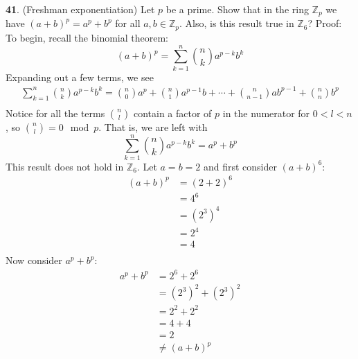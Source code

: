 \documentclass{article}
\begin{document}
\newline\newline
\textbf{41}. (Freshman exponentiation) Let $p$ be a prime. Show that in the ring $\mathbb{Z}_p$ we have $(a + b)^p = a^p + b^p$ for all $a,b \in \mathbb{Z}_p$. Also, is this result true in $\mathbb{Z}_6$?
\newline\newline
Proof: To begin, recall the binomial theorem:
\[(a + b)^p = \sum_{k=1}^n {n \choose k} a^{p-k}b^k\]
Expanding out a few terms, we see
\begin{align*}
    \sum_{k=1}^n {n \choose k} a^{p-k}b^k = {n \choose 0}a^p + {n \choose 1} a^{p-1}b + \cdots + {n \choose n-1}ab^{p-1} + {n \choose n}b^p \\
\end{align*}
Notice for all the terms ${n \choose l}$ contain a factor of $p$ in the numerator for $0 < l < n$, so ${n \choose l} = 0 \mod{p}$. That is, we are left with
\[\sum_{k=1}^n {n \choose k} a^{p-k}b^k = a^p + b^p\]
This result does not hold in $\mathbb{Z}_6$. Let $a = b = 2$ and first consider $(a + b)^6$:
\begin{align*}
    (a + b)^p &= (2 + 2)^6 \\
    &= 4^6 \\
    &= (2^3)^4 \\ 
    &= 2^4 \\
    &= 4\\
\end{align*}
Now consider $a^p + b^p$:
\begin{align*}
    a^p + b^p &= 2^6 + 2^6 \\
    &= (2^3)^2 + (2^3)^2 \\
    &= 2^2 + 2^2 \\
    &= 4 + 4 \\
    &= 2 \\
    &\neq (a + b)^p \\
\end{align*}
\end{document}
